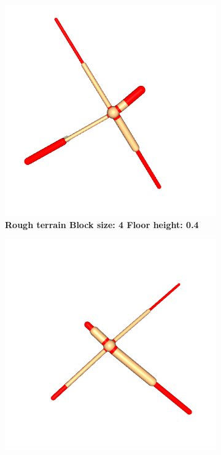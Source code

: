 \begin{figure}[!ht]
            \begin{subfigure}{\textwidth}
                \centering
                \begin{minipage}{0.19\textwidth}
                    \centering
                    \includegraphics[width=\linewidth]{resources/specialist_1_2835/rough_4_0.4.png}
                    \textbf{Rough terrain Block size: 4 Floor height: 0.4}
                \end{minipage}
                \hfill
                \begin{minipage}{0.19\textwidth}
                    \centering
                    \includegraphics[width=\linewidth]{resources/specialist_1_2835/default.png}

\end{minipage}
\end{subfigure}
\end{figure}
